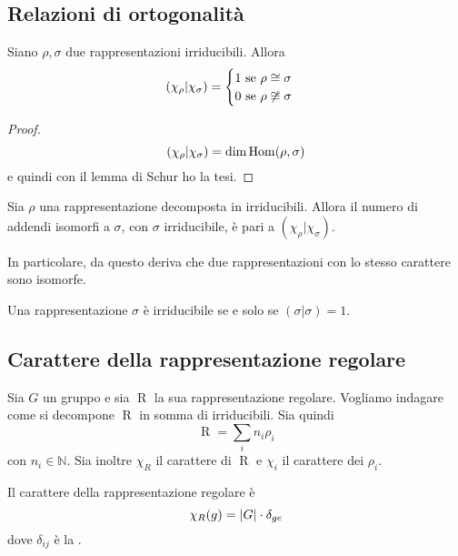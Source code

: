 \documentclass[a4paper,10pt,oneside]{math_article}
\newcommand{\herm}[2]{\left(#1 | #2\right)}
\DeclareMathOperator{\Reg}{R}
\begin{document}
   \subsection{Relazioni di ortogonalità}
    \begin{mytheorem}
     Siano $\rho,\sigma$ due rappresentazioni irriducibili. Allora
     \[
      \herm {\chi_\rho} {\chi_\sigma} = \begin{cases}
                           1 \mbox{ se } \rho \isom \sigma \\
                           0 \mbox{ se } \rho \not\isom \sigma
                          \end{cases}
     \]
    \end{mytheorem}
    \begin{proof}
     \[
      \herm {\chi_\rho}{\chi_\sigma}=\dim \Hom(\rho,\sigma)
     \]
     e quindi con il lemma di Schur ho la tesi.
    \end{proof}
    
    \begin{myprop}\label{pr:IrrCount}
     Sia $\rho$ una rappresentazione decomposta in irriducibili. Allora il numero di addendi isomorfi a $\sigma$, con $\sigma$ irriducibile, è pari a $\herm{\chi_\rho}{\chi_\sigma}$.
    \end{myprop}

    In particolare, da questo deriva che due rappresentazioni con lo stesso carattere sono isomorfe.
    
    \begin{mytheorem}
     Una rappresentazione $\sigma$ è irriducibile se e solo se $\herm\sigma\sigma=1$.
    \end{mytheorem}

   \subsection{Carattere della rappresentazione regolare}
    Sia $G$ un gruppo e sia $\Reg$ la sua rappresentazione regolare. Vogliamo indagare come si decompone $\Reg$ in somma di irriducibili. Sia quindi
    \[
     \Reg = \sum_i n_i \rho_i
    \]
    con $n_i \in \mathbb N$. Sia inoltre $\chi_R$ il carattere di $\Reg$ e $\chi_i$ il carattere dei $\rho_i$.
      
    \begin{myprop}
     Il carattere della rappresentazione regolare è
      \[
      \chi_R(g) = \left|G\right| \cdot \delta_{ge}
      \]
     dove $\delta_{ij}$ è la .
    \end{myprop}
    
\end{document}
